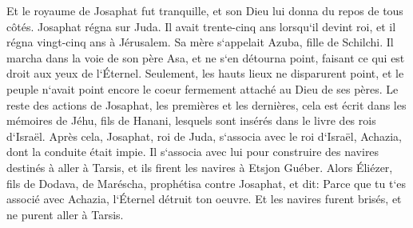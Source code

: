 \verse Et le royaume de Josaphat fut tranquille, et son Dieu lui donna du repos de tous côtés. 
\verse Josaphat régna sur Juda. Il avait trente-cinq ans lorsqu`il devint roi, et il régna vingt-cinq ans à Jérusalem. Sa mère s`appelait Azuba, fille de Schilchi. 
\verse Il marcha dans la voie de son père Asa, et ne s`en détourna point, faisant ce qui est droit aux yeux de l`Éternel. 
\verse Seulement, les hauts lieux ne disparurent point, et le peuple n`avait point encore le coeur fermement attaché au Dieu de ses pères. 
\verse Le reste des actions de Josaphat, les premières et les dernières, cela est écrit dans les mémoires de Jéhu, fils de Hanani, lesquels sont insérés dans le livre des rois d`Israël. 
\verse Après cela, Josaphat, roi de Juda, s`associa avec le roi d`Israël, Achazia, dont la conduite était impie. 
\verse Il s`associa avec lui pour construire des navires destinés à aller à Tarsis, et ils firent les navires à Etsjon Guéber. 
\verse Alors Éliézer, fils de Dodava, de Maréscha, prophétisa contre Josaphat, et dit: Parce que tu t`es associé avec Achazia, l`Éternel détruit ton oeuvre. Et les navires furent brisés, et ne purent aller à Tarsis. 

\chapter{}


